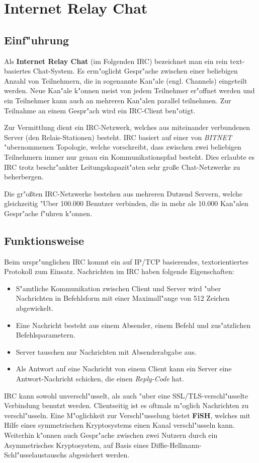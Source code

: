 
\section{Internet Relay Chat}
\subsection{Einf"uhrung}
Als \textbf{Internet Relay Chat} (im Folgenden IRC) bezeichnet man ein rein text-basiertes Chat-System. Es erm"oglicht Gespr"ache zwischen einer beliebigen Anzahl von Teilnehmern, die in sogenannte Kan"ale (engl. Channels) eingeteilt werden. Neue Kan"ale k"onnen meist von jedem Teilnehmer er"offnet werden und ein Teilnehmer kann auch an mehreren Kan"alen parallel teilnehmen. Zur Teilnahme an einem Gespr"ach wird ein IRC-Client ben"otigt. 

Zur Vermittlung dient ein IRC-Netzwerk, welches aus miteinander verbundenen Server (den Relais-Stationen) besteht. 
IRC basiert auf einer von \textit{BITNET} "ubernommenen Topologie, welche vorschreibt, dass zwischen zwei beliebigen Teilnehmern immer nur genau ein Kommunikationspfad besteht. Dies erlaubte es IRC trotz beschr"ankter Leitungskapazit"aten sehr große Chat-Netzwerke zu beherbergen.

Die gr"oßten IRC-Netzwerke bestehen aus mehreren Dutzend Servern, welche gleichzeitig "Uber 100.000 Benutzer verbinden, die in mehr als 10.000 Kan"alen Gespr"ache f"uhren k"onnen.

\subsection{Funktionsweise}
Beim urspr"unglichen IRC kommt ein auf IP/TCP basierendes, textorientiertes Protokoll zum Einsatz.
Nachrichten im IRC haben folgende Eigenschaften:
\begin{itemize}
\item S"amtliche Kommunikation zwischen Client und Server wird "uber Nachrichten in Befehlsform mit einer Maximall"ange von 512 Zeichen abgewickelt.
\item Eine Nachricht besteht aus einem Absender, einem Befehl und zus"atzlichen Befehlsparametern.
\item Server tauschen nur Nachrichten mit Absenderabgabe aus.
\item Als Antwort auf eine Nachricht von einem Client kann ein Server eine Antwort-Nachricht schicken, die einen \textit{Reply-Code} hat. 
\end{itemize}
IRC kann sowohl unverschl"usselt, als auch "uber eine SSL/TLS-verschl"usselte Verbindung benutzt werden. Clientseitig ist es oftmals m"oglich Nachrichten zu verschl"usseln. Eine M"oglichkeit zur Verschl"usselung bietet \textbf{FiSH}, welches mit Hilfe eines symmetrischen Kryptosystems einen Kanal verschl"usseln kann. Weiterhin k"onnen auch Gespr"ache zwischen zwei Nutzern durch ein Asymmetrisches Kryptosystem, auf Basis eines Diffie-Hellmann-Schl"usselaustauschs abgesichert werden.

